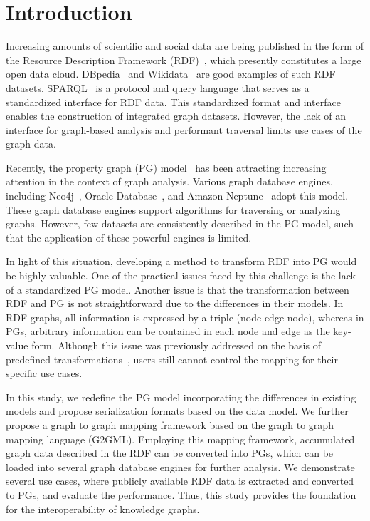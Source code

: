 \documentclass[runningheads]{llncs}
\begin{document}
\section{Introduction}

Increasing amounts of scientific and social data are being published in the form of the Resource Description Framework (RDF)~\cite{rdf}, which presently constitutes a large open data cloud. DBpedia~\cite{dbpedia} and Wikidata~\cite{wikidata} are good examples of such RDF datasets. SPARQL~\cite{sparql} is a protocol and query language that serves as a standardized interface for RDF data. This standardized format and interface enables the construction of integrated graph datasets. However, the lack of an interface for graph-based analysis and performant traversal limits use cases of the graph data.

Recently, the property graph (PG) model~\cite{angles1,angles2} has been attracting increasing attention in the context of graph analysis. Various graph database engines, including Neo4j~\cite{neo4j}, Oracle Database~\cite{oracle}, and Amazon Neptune~\cite{neptune} adopt this model. These graph database engines support algorithms for traversing or analyzing graphs. However, few datasets are consistently described in the PG model, such that the application of these powerful engines is limited.

In light of this situation, developing a method to transform RDF into PG would be highly valuable. One of the practical issues faced by this challenge is the lack of a standardized PG model.
Another issue is that the transformation between RDF and PG is not straightforward due to the differences in their models. 
In RDF graphs, all information is expressed by a triple (node-edge-node), whereas in PGs, arbitrary information can be contained in each node and edge as the key-value form. 
Although this issue was previously addressed on the basis of predefined transformations~\cite{hartig},
users still cannot control the mapping for their specific use cases.

In this study, we redefine the PG model incorporating the differences in existing models and propose serialization formats based on the data model. We further propose a graph to graph mapping framework based on the graph to graph mapping language (G2GML). Employing this mapping framework, accumulated graph data described in the RDF can be converted into PGs, which can be loaded into several graph database engines for further analysis. We demonstrate several use cases, where publicly available RDF data is extracted and converted to PGs, and evaluate the performance. Thus, this study provides the foundation for the interoperability of knowledge graphs.
\end{document}
